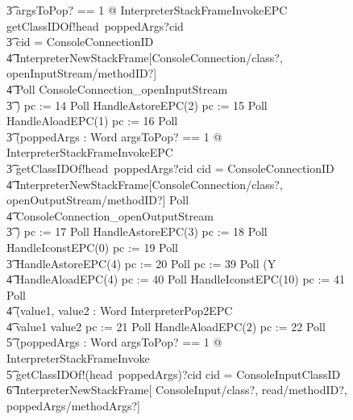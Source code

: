 \begin{figure}[tp!]
{\begin{circus}
    \t3 \lschexpract \exists argsToPop? == 1 @ InterpreterStackFrameInvokeEPC \rschexpract \circseq getClassIDOf!head~poppedArgs?cid \then {} \\
    \t3 \circif cid = ConsoleConnectionID \circthen {} \\
    \t4 \lschexpract InterpreterNewStackFrame[ConsoleConnection/class?, openInputStream/methodID?] \rschexpract \circseq \\
    \t4 Poll \circseq ConsoleConnection\_openInputStream \\
    \t3 \circfi) \circseq pc := 14 \circseq Poll \circseq HandleAstoreEPC(2) \circseq pc := 15 \circseq Poll \circseq HandleAloadEPC(1) \circseq pc := 16 \circseq Poll \circseq \\
    \t3 (\circvar poppedArgs : Word \circspot \lschexpract \exists argsToPop? == 1 @ InterpreterStackFrameInvokeEPC \rschexpract \circseq \\
    \t3 getClassIDOf!head~poppedArgs?cid \then \circif cid = ConsoleConnectionID \circthen {} \\
    \t4 \lschexpract InterpreterNewStackFrame[ConsoleConnection/class?, openOutputStream/methodID?] \rschexpract \circseq Poll \circseq \\
    \t4 ConsoleConnection\_openOutputStream \\
    \t3 \circfi) \circseq pc := 17 \circseq Poll \circseq HandleAstoreEPC(3) \circseq pc := 18 \circseq Poll \circseq HandleIconstEPC(0) \circseq pc := 19 \circseq Poll \circseq \\
    \t3 HandleAstoreEPC(4) \circseq pc := 20 \circseq Poll \circseq pc := 39 \circseq Poll \circseq (\circmu Y \circspot \\
    \t4 HandleAloadEPC(4) \circseq pc := 40 \circseq Poll \circseq HandleIconstEPC(10) \circseq  pc := 41 \circseq Poll \circseq \\
    \t4 (\circvar value1, value2 : Word \circspot InterpreterPop2EPC \\
    \t4 \circif value1 \leq value2 \circthen pc := 21 \circseq Poll \circseq HandleAloadEPC(2) \circseq pc := 22 \circseq Poll \circseq \\
    \t5 (\circvar poppedArgs : \seq Word \circspot \lschexpract \exists argsToPop?  == 1 @ InterpreterStackFrameInvoke \rschexpract \circseq \\
    \t5 getClassIDOf!(head~poppedArgs)?cid \then \circif cid = ConsoleInputClassID \circthen {} \\
    \t6 \lschexpract InterpreterNewStackFrame[ ConsoleInput/class?, read/methodID?, poppedArgs/methodArgs?] \rschexpract \circseq \\

\end{circus}}
\end{figure}
